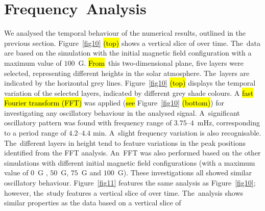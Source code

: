 \documentclass[physics,article,accept,pdftex,moreauthors]{Definitions/mdpi}
\begin{document}

\section{Frequency~Analysis}

 We analysed the temporal behaviour of the numerical results, outlined in the previous section. %
Figure~\ref{fig10} \hl{(top)} %
shows a vertical slice of %
over time.  The~data are based on the simulation with the initial magnetic field configuration with a maximum value of $100$~G. 
 \hl{From}~this two-dimensional plane, five layers were selected, representing different heights in the solar atmosphere. 
The~layers are indicated by the horizontal grey lines.   %
Figure~\ref{fig10} \hl{(top)} 
displays the temporal variation of the selected layers, indicated by different grey shade colours. 
A %
\hl{fast Fourier transform %
(FFT)} was applied (\hl{see} %
Figure~\ref{fig10} \hl{(bottom)}) 
 for investigating any oscillatory behaviour in the analysed signal. A~significant 
oscillatory pattern was found with frequency range of $3.75$--$4$~mHz, corresponding to a period range of $4.2$--$4.4$ min. 
A~slight frequency variation is also recognisable. The~different layers in height tend to feature variations in the peak positions 
identified from the FFT analysis. An~FFT was also performed based on the other simulations with different initial magnetic field 
configurations (with a maximum value of $0$~G , $50$~G,  $75$~G  and $100$~G). These investigations all showed similar oscillatory behaviour.  
Figure~\ref{fig11} features the same analysis as Figure~\ref{fig10}; however, the~study features a vertical slice of 
over time. The~analysis shows similar properties as the data based on a vertical slice of 
 
\end{document}

